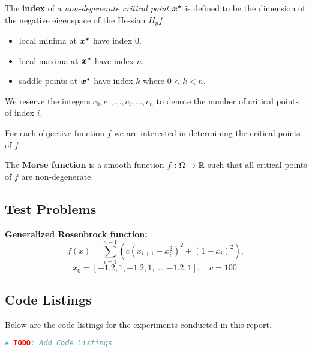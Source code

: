 \documentclass[10pt]{article}
\begin{document}
    \begin{definition}
        The \textbf{index} of a \emph{non-degenerate critical point} $\bm{x^*}$ is defined to be
        the dimension of the negative eigenspace of the Hessian $H_p f$.
        \begin{itemize}
            \item local minima at $\bm{x^*}$ have index $0$.
            \item local maxima at $\bm{x^*}$ have index $n$.
            \item saddle points at $\bm{x^*}$ have index $k$ where $0 < k < n$.
        \end{itemize}
        We reserve the integers $c_0, c_1, \dots, c_i, \dots, c_n$ to denote the number of
        critical points of index $i$.
    \end{definition}

    \begin{remark}
        For each objective function $f$ we are interested in determining the
        critical points of $f$ 
    \end{remark}

    \begin{remark}
        The \textbf{Morse function} is a smooth function $f : \Omega \rightarrow \mathbb{R}$ such that
        all critical points of $f$ are non-degenerate.
    \end{remark}


\subsection{Test Problems}

\textbf{Generalized Rosenbrock function:}
    \[
    f(x) = \sum_{i=1}^{n-1} \left( c(x_{i+1} - x_i^2)^2 + (1 - x_i)^2 \right),
    \]
    \[
    x_0 = [-1.2, 1, -1.2, 1, \dots, -1.2, 1], \quad c = 100.
    \]



\subsection{Code Listings}

Below are the code listings for the experiments conducted in this report.

\lstset{language=julia}
\begin{lstlisting}[language=julia, caption={Algorithm 16.5}]
   # TODO: Add Code Listings
\end{lstlisting}
\newpage
\end{document}
